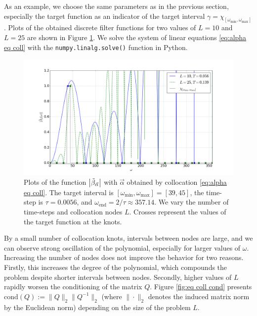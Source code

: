 \documentclass[a4paper,11pt,bibliography=totoc,listof=totoc,headinclude=true,cleardoublepage=empty,oneside]{scrbook}
\newcommand{\dffv}{\Tilde{\beta}_{\Vec{\alpha}}}
\newcommand{\e}{\mathrm{end}}
\begin{document}
As an example, we choose the same parameters as in the previous section, especially the target function as an indicator of the target interval $\gamma = \chi_{\left[\omega_{\min}, \omega_{\max}\right]}$. Plots of the obtained discrete filter functions for two values of $L = 10 $ and $L=25$ are shown in Figure \ref{fig:eq coll beta}. We solve the system of linear equations \eqref{eq:alpha eq coll} with the \texttt{numpy.linalg.solve()} function in Python.

\begin{figure}[h]
    \centering
    \includegraphics[width=1\linewidth]{latex//images//equi_coll/Figure_1.png}
    \caption{Plots of the function $\left|\dffv\right|$ with $\Vec{\alpha}$ obtained by collocation \eqref{eq:alpha eq coll}. The target interval is $\left[\omega_{\min}, \omega_{\max} \right] = [39, 45]$, the time-step is $\tau = 0.0056$, and $\omega_\e = 2/\tau \approx 357.14$. We vary the number of time-steps and collocation nodes $L$. Crosses represent the values of the target function at the knots.}
    \label{fig:eq coll beta}
\end{figure}
\newpage
By a small number of collocation knots, intervals between nodes are large, and we can observe strong oscillation of the polynomial, especially for larger values of $\omega$. Increasing the number of nodes does not improve the behavior for two reasons. Firstly, this increases the degree of the polynomial, which compounds the problem despite shorter intervals between nodes. Secondly, higher values of $L$ rapidly worsen the conditioning of the matrix $Q$. Figure \ref{fig:eq coll cond} presents $\mathrm{cond}(Q) := \|Q\|_2 \|Q^{-1}\|_2$ (where $\| \cdot \|_2$ denotes the induced matrix norm by the Euclidean norm) depending on the size of the problem $L$.
\end{document}
